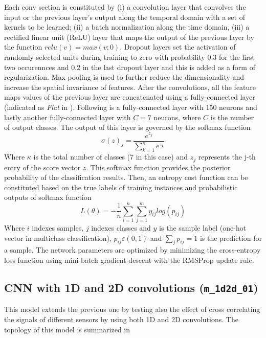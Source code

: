 Each conv section is constituted by (i) a convolution layer that convolves the input or the previous layer's output along the temporal domain with a set of kernels to be learned; (ii) a batch normalization along the time domain, (iii)  a rectified linear unit (ReLU) layer that maps the output of the previous layer by the function $ relu(v) = max(v; 0) $. Dropout layers set the activation of \mbox{randomly-selected} units during training to zero with probability 0.3 for the first two occurennces and 0.2 in the last dropout layer and this is added as a form of regularization. Max pooling is used to further reduce the dimensionality and increase the spatial invariance of features. After the convolutions, all the feature maps values of the previous layer are concatenated using a \mbox{fully-connected} layer (indicated as {\it Flat} in ). Following is a \mbox{fully-connected} layer with 150 neurons and lastly another \mbox{fully-connected} layer with $C=7$ neurons, where $C$ is the number of output classes.
The output of this layer is governed by the softmax function
$$ \sigma(z)_j = \frac{e^{z_j}}{\sum_{k=1}^{\kappa} e^{z_k}} $$
Where $ \kappa $ is the total number of classes (7 in this case) and $ z_j $ represents the j-th entry of the score vector $ z $.
This softmax function provides the posterior probability of the classification results. Then, an entropy cost function can be constituted based on the true labels of training instances and probabilistic outputs of softmax function
$$ L(\theta) = -\frac{1}{n} \sum_{i=1}^{n} \sum_{j=1}^{m} y_{ij} log(p_{ij}) $$
Where $i$ indexes samples, $j$ indexes classes and $y$ is the sample label (one-hot vector in multiclass classification), $p_{ij} \varepsilon (0,1)$ and $\sum_{j} p_{ij} = 1$ is the prediction for a sample.
The network parameters are optimized by minimizing the cross-entropy loss function using mini-batch gradient descent with the RMSProp update rule. \\

\subsection{CNN with 1D and 2D convolutions (\texttt{m_1d2d_01})}
\label{sec:m_1d2d}
This model extends the previous one by testing also the effect of cross correlating the signals of different sensors by using both 1D and 2D convolutions. The topology of this model is summarized in 

